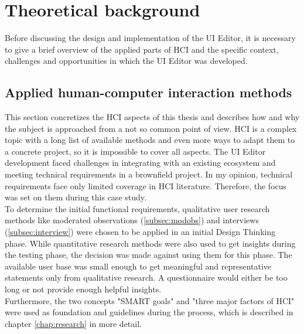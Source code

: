 
%
\chapter{Theoretical background}
\label{chap:background}

Before discussing the design and implementation of the UI Editor, it is necessary to give a brief overview of the applied parts of HCI and the specific context, challenges and opportunities in which the UI Editor was developed.
% 

\section{Applied human-computer interaction methods}

This section concretizes the HCI aspects of this thesis and describes how and why the subject is approached from a not so common point of view.
HCI is a complex topic with a long list of available methods and even more ways to adapt them to a concrete project, so it is impossible to cover all aspects.
The UI Editor development faced challenges in integrating with an existing ecosystem and meeting technical requirements in a \gls{brownfield} project.
In my opinion, technical requirements face only limited coverage in HCI literature.
Therefore, the focus was set on them during this case study.
\\
To determine the initial functional requirements, qualitative user research methods like moderated observations (\ref{subsec:modobs}) and interviews (\ref{subsec:interview}) were chosen to be applied in an initial Design Thinking phase.
While quantitative research methods were also used to get insights during the testing phase, the decision was made against using them for this phase.
The available user base was small enough to get meaningful and representative statements only from qualitative research.
A questionnaire would either be too long or not provide enough helpful insights.
\\
Furthermore, the two concepts "SMART goals" and "three major factors of HCI" were used as foundation and guidelines during the process, which is described in chapter \ref{chap:research} in more detail.

